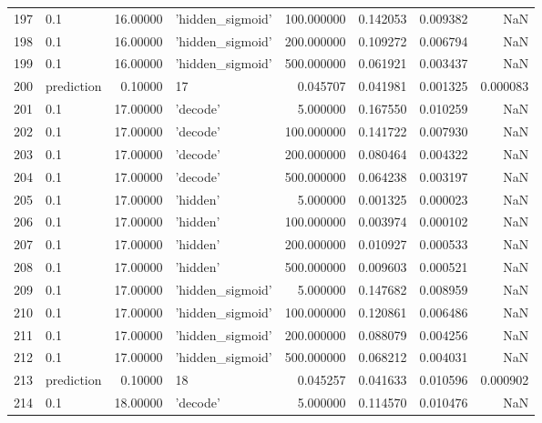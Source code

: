 \documentclass[10pt,a4paper]{article}
\begin{document}
\begin{tabular}{llrlrrrr}
197  &         0.1 &  16.00000 &   'hidden\_sigmoid' &  100.000000 &  0.142053 &  0.009382 &       NaN \\
198  &         0.1 &  16.00000 &   'hidden\_sigmoid' &  200.000000 &  0.109272 &  0.006794 &       NaN \\
199  &         0.1 &  16.00000 &   'hidden\_sigmoid' &  500.000000 &  0.061921 &  0.003437 &       NaN \\
200  &  prediction &   0.10000 &                 17 &    0.045707 &  0.041981 &  0.001325 &  0.000083 \\
201  &         0.1 &  17.00000 &           'decode' &    5.000000 &  0.167550 &  0.010259 &       NaN \\
202  &         0.1 &  17.00000 &           'decode' &  100.000000 &  0.141722 &  0.007930 &       NaN \\
203  &         0.1 &  17.00000 &           'decode' &  200.000000 &  0.080464 &  0.004322 &       NaN \\
204  &         0.1 &  17.00000 &           'decode' &  500.000000 &  0.064238 &  0.003197 &       NaN \\
205  &         0.1 &  17.00000 &           'hidden' &    5.000000 &  0.001325 &  0.000023 &       NaN \\
206  &         0.1 &  17.00000 &           'hidden' &  100.000000 &  0.003974 &  0.000102 &       NaN \\
207  &         0.1 &  17.00000 &           'hidden' &  200.000000 &  0.010927 &  0.000533 &       NaN \\
208  &         0.1 &  17.00000 &           'hidden' &  500.000000 &  0.009603 &  0.000521 &       NaN \\
209  &         0.1 &  17.00000 &   'hidden\_sigmoid' &    5.000000 &  0.147682 &  0.008959 &       NaN \\
210  &         0.1 &  17.00000 &   'hidden\_sigmoid' &  100.000000 &  0.120861 &  0.006486 &       NaN \\
211  &         0.1 &  17.00000 &   'hidden\_sigmoid' &  200.000000 &  0.088079 &  0.004256 &       NaN \\
212  &         0.1 &  17.00000 &   'hidden\_sigmoid' &  500.000000 &  0.068212 &  0.004031 &       NaN \\
213  &  prediction &   0.10000 &                 18 &    0.045257 &  0.041633 &  0.010596 &  0.000902 \\
214  &         0.1 &  18.00000 &           'decode' &    5.000000 &  0.114570 &  0.010476 &       NaN \\

\end{tabular}
\end{document}
